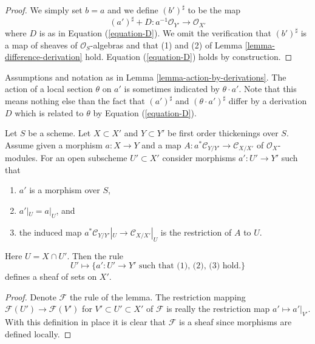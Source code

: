 \begin{proof}
We simply set $b = a$ and we define $(b')^\sharp$ to be the map
$$
(a')^\sharp + D : a^{-1}\mathcal{O}_{Y'} \to \mathcal{O}_{X'}
$$
where $D$ is as in Equation (\ref{equation-D}). We omit the verification
that $(b')^\sharp$ is a map of sheaves of $\mathcal{O}_S$-algebras and
that (1) and (2) of
Lemma \ref{lemma-difference-derivation}
hold. Equation (\ref{equation-D}) holds by construction.
\end{proof}

\begin{remark}
\label{remark-action-by-derivations}
Assumptions and notation as in Lemma \ref{lemma-action-by-derivations}.
The action of a local section $\theta$ on $a'$ is sometimes indicated by
$\theta \cdot a'$. Note that this means nothing else than the fact
that $(a')^\sharp$ and $(\theta \cdot a')^\sharp$ differ by a derivation
$D$ which is related to $\theta$ by Equation (\ref{equation-D}).
\end{remark}

\begin{lemma}
\label{lemma-sheaf}
Let $S$ be a scheme.
Let $X \subset X'$ and $Y \subset Y'$ be first order thickenings
over $S$. Assume given a morphism $a : X \to Y$ and a map
$A : a^*\mathcal{C}_{Y/Y'} \to \mathcal{C}_{X/X'}$ of
$\mathcal{O}_X$-modules. For an open subscheme $U' \subset X'$
consider morphisms $a' : U' \to Y'$ such that
\begin{enumerate}
\item $a'$ is a morphism over $S$,
\item $a'|_U = a|_U$, and
\item the induced map
$a^*\mathcal{C}_{Y/Y'}|_U \to \mathcal{C}_{X/X'}|_U$
is the restriction of $A$ to $U$.
\end{enumerate}
Here $U = X \cap U'$. Then the rule
\begin{equation}
\label{equation-sheaf}
U' \mapsto
\{a' : U' \to Y'\text{ such that (1), (2), (3) hold.}\}
\end{equation}
defines a sheaf of sets on $X'$.
\end{lemma}

\begin{proof}
Denote $\mathcal{F}$ the rule of the lemma.
The restriction mapping $\mathcal{F}(U') \to \mathcal{F}(V')$ for
$V' \subset U' \subset X'$
of $\mathcal{F}$ is really the restriction map $a' \mapsto a'|_{V'}$.
With this definition in place it is clear that $\mathcal{F}$ is a
sheaf since morphisms are defined locally.
\end{proof}

